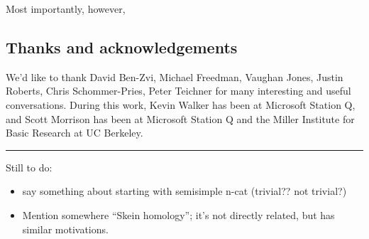 Most importantly, however,  


\subsection{Thanks and acknowledgements}
We'd like to thank David Ben-Zvi, Michael Freedman, Vaughan Jones, Justin Roberts, Chris Schommer-Pries, Peter Teichner  for many interesting and useful conversations. During this work, Kevin Walker has been at Microsoft Station Q, and Scott Morrison has been at Microsoft Station Q and the Miller Institute for Basic Research at UC Berkeley.


\medskip\hrule\medskip

Still to do:
\begin{itemize}
\item say something about starting with semisimple n-cat (trivial?? not trivial?)
\item Mention somewhere \cite{MR1624157} ``Skein homology''; it's not directly related, but has similar motivations.
\end{itemize}

